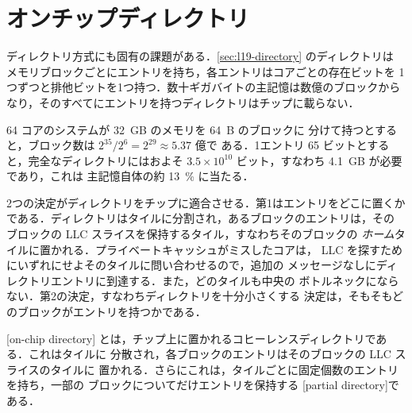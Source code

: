 \documentclass[../main.tex]{subfiles}
\begin{document}
\section{オンチップディレクトリ}
\label{sec:l22-directory}

ディレクトリ方式にも固有の課題がある．\cref{sec:l19-directory} のディレクトリは
メモリブロックごとにエントリを持ち，各エントリはコアごとの存在ビットを
1つずつと排他ビットを1つ持つ．数十ギガバイトの主記憶は数億のブロックから
なり，そのすべてにエントリを持つディレクトリはチップに載らない．

\begin{example}
  \label{ex:l22-directory-size}
  64 コアのシステムが \SI{32}{GB} のメモリを \SI{64}{B} のブロックに
  分けて持つとすると，ブロック数は $2^{35}/2^{6}=2^{29}\approx 5.37$ 億で
  ある．1エントリ 65 ビットとすると，完全なディレクトリにはおよそ
  $3.5\times10^{10}$ ビット，すなわち \SI{4.1}{GB} が必要であり，これは
  主記憶自体の約 \SI{13}{\percent} に当たる．
\end{example}

2つの決定がディレクトリをチップに適合させる．第1はエントリをどこに置くか
である．ディレクトリはタイルに分割され，あるブロックのエントリは，その
ブロックの LLC スライスを保持するタイル，すなわちそのブロックの
\emph{ホーム}タイルに置かれる．プライベートキャッシュがミスしたコアは，
LLC を探すためにいずれにせよそのタイルに問い合わせるので，追加の
メッセージなしにディレクトリエントリに到達する．また，どのタイルも中央の
ボトルネックにならない．第2の決定，すなわちディレクトリを十分小さくする
決定は，そもそもどのブロックがエントリを持つかである．

\begin{definition}[オンチップディレクトリ]
  [on-chip directory]%
  とは，チップ上に置かれるコヒーレンスディレクトリである．これはタイルに
  分散され，各ブロックのエントリはそのブロックの LLC スライスのタイルに
  置かれる．さらにこれは，タイルごとに固定個数のエントリを持ち，一部の
  ブロックについてだけエントリを保持する
  [partial directory]である．
\end{definition}
\end{document}
